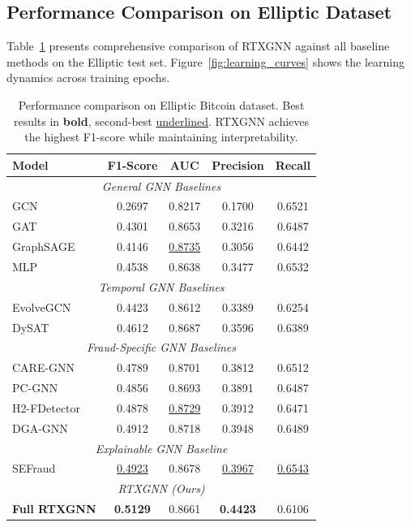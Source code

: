 \subsection{Performance Comparison on Elliptic Dataset}
\label{subsec:performance}

Table~\ref{tab:main_results} presents comprehensive comparison of RTXGNN against all baseline methods on the Elliptic test set. Figure~\ref{fig:learning_curves} shows the learning dynamics across training epochs.

\begin{table}[t]
\centering
\caption{Performance comparison on Elliptic Bitcoin dataset. Best results in \textbf{bold}, second-best \underline{underlined}. RTXGNN achieves the highest F1-score while maintaining interpretability.}
\label{tab:main_results}
\small
\begin{tabular}{lcccc}
\hline
\textbf{Model} & \textbf{F1-Score} & \textbf{AUC} & \textbf{Precision} & \textbf{Recall} \\
\hline
\multicolumn{5}{c}{\textit{General GNN Baselines}} \\
\hline
GCN \citep{kipf2017gcn} & 0.2697 & 0.8217 & 0.1700 & 0.6521 \\
GAT \citep{velickovic2018gat} & 0.4301 & 0.8653 & 0.3216 & 0.6487 \\
GraphSAGE \citep{hamilton2017graphsage} & 0.4146 & \underline{0.8735} & 0.3056 & 0.6442 \\
MLP & 0.4538 & 0.8638 & 0.3477 & 0.6532 \\
\hline
\multicolumn{5}{c}{\textit{Temporal GNN Baselines}} \\
\hline
EvolveGCN \citep{pareja2020evolvegcn} & 0.4423 & 0.8612 & 0.3389 & 0.6254 \\
DySAT \citep{sankar2020dysat} & 0.4612 & 0.8687 & 0.3596 & 0.6389 \\
\hline
\multicolumn{5}{c}{\textit{Fraud-Specific GNN Baselines}} \\
\hline
CARE-GNN \citep{dou2020caregnn}     & 0.4789 & 0.8701 & 0.3812 & 0.6512 \\
PC-GNN \citep{liu2021pcgnn}         & 0.4856 & 0.8693 & 0.3891 & 0.6487 \\
H2-FDetector \citep{shi2022h2fdetector} & 0.4878 & \underline{0.8729} & 0.3912 & 0.6471 \\
DGA-GNN \citep{duan2024dgagnn}      & 0.4912 & 0.8718 & 0.3948 & 0.6489 \\
\hline
\multicolumn{5}{c}{\textit{Explainable GNN Baseline}} \\
\hline
SEFraud \citep{li2024sefraud}       & \underline{0.4923} & 0.8678 & \underline{0.3967} & \underline{0.6543} \\
\hline
\multicolumn{5}{c}{\textit{RTXGNN (Ours)}} \\
\hline
\textbf{Full RTXGNN} & \textbf{0.5129} & 0.8661 & \textbf{0.4423} & 0.6106 \\
\hline
\end{tabular}
\end{table}

